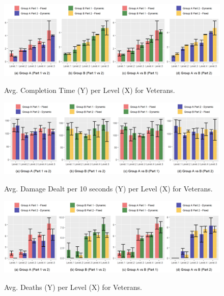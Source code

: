 \begin{figure}[!ht]
    \begin{center}
    \caption{Avg. Completion Time (Y) per Level (X) for Veterans.}
        \includegraphics[width=\textwidth]{figures/completion_time-veteran_players.png}
        \label{fig:result-metric-veterans-completion-time}
    \end{center}
\end{figure}

\begin{figure}[!ht]
    \begin{center}
    \caption{Avg. Damage Dealt per 10 seconds (Y) per Level (X) for Veterans.}
        \includegraphics[width=\textwidth]{figures/damage_dealt_per_10s-veteran_players.png}
        \label{fig:result-metric-veterans-damage-dealt-per-10s}
    \end{center}
\end{figure}

\begin{figure}[!ht]
    \begin{center}
    \caption{Avg. Deaths (Y) per Level (X) for Veterans.}
        \includegraphics[width=\textwidth]{figures/deaths_per_level-veteran_players.png}
        \label{fig:result-metric-veterans-deaths-per-level}
    \end{center}
\end{figure}

